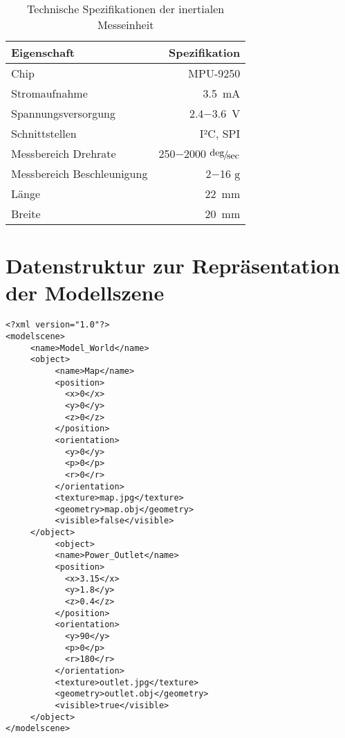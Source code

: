 \begin{table}[ht]
\begin{center}
\setlength{\tabcolsep}{20pt}
\begin{tabular}{lr}
\toprule
Eigenschaft & Spezifikation \\
\midrule
Chip & MPU-9250 \\ \addlinespace
Stromaufnahme & \SI{3,5}{\milli\ampere} \\ \addlinespace
Spannungsversorgung & \SI{2,4}{}$-$\SI{3,6}{\volt} \\ \addlinespace
Schnittstellen & I²C, SPI \\ \addlinespace
Messbereich Drehrate & \SI{250}{}$-$\SI{2000}{} $\nicefrac{\deg}{\sec}$\\ \addlinespace
Messbereich Beschleunigung &  \SI{2}{}$-$\SI{16}{} $\mathrm{g}$\\ \addlinespace
Länge & \SI{22}{\milli\meter} \\ \addlinespace
Breite & \SI{20}{\milli\meter}\\
\bottomrule
\end{tabular}
\caption{Technische Spezifikationen der inertialen Messeinheit}
\end{center}
\label{tab:imu}
\end{table}

\clearpage{}

\section{Datenstruktur zur Repräsentation der Modellszene}
\label{app.datastructure}
\begin{lstlisting}[label=source.data,caption=Datenstruktur zur Repräsentation der Modellszene]
<?xml version="1.0"?>
<modelscene>
     <name>Model_World</name>
     <object>
          <name>Map</name>
          <position>
          	<x>0</x>
          	<y>0</y>
          	<z>0</z>
          </position>
          <orientation>
          	<y>0</y>
          	<p>0</p>
          	<r>0</r>
          </orientation>
          <texture>map.jpg</texture>
          <geometry>map.obj</geometry>
          <visible>false</visible>
     </object>
          <object>
          <name>Power_Outlet</name>
          <position>
          	<x>3.15</x>
          	<y>1.8</y>
          	<z>0.4</z>
          </position>
          <orientation>
          	<y>90</y>
          	<p>0</p>
          	<r>180</r>
          </orientation>
          <texture>outlet.jpg</texture>
          <geometry>outlet.obj</geometry>
          <visible>true</visible>
     </object>
</modelscene>
\end{lstlisting}

\clearpage{}

%

%
%
